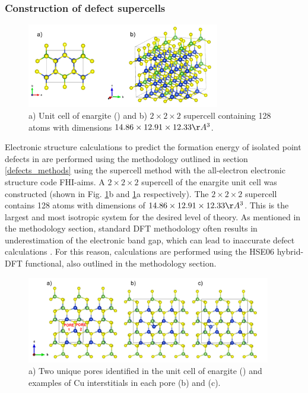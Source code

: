 \documentclass[11pt, twoside]{report}
\begin{document}
\subsubsection{Construction of defect supercells}

\begin{figure}[h!]
    \centering
    \includegraphics[width=0.75\textwidth]{figures/enargite_supercell.png}
    \caption{a) Unit cell of enargite ({\enargite}) and b) $2\times2\times2$ supercell containing 128 atoms with dimensions $14.86\times12.91\times12.33 \AA^3$.}
    \label{enargite_supercell}
\end{figure}

Electronic structure calculations to predict the formation energy of isolated point defects in {\enargite} are performed using the methodology outlined in section \ref{defects_methods} using the supercell method with the all-electron electronic structure code FHI-aims. A $2\times2\times2$ supercell of the enargite unit cell was constructed (shown in Fig. \ref{enargite_supercell}b and \ref{enargite_supercell}a respectively). The $2\times2\times2$ supercell contains 128 atoms with dimensions of $14.86\times12.91\times12.33 \AA^3$. This is the largest and most isotropic system for the desired level of theory. As mentioned in the methodology section, standard DFT methodology often results in underestimation of the electronic band gap, which can lead to inaccurate defect calculations \cite{Lany_defects}. For this reason, calculations are performed using the HSE06 hybrid-DFT functional, also outlined in the methodology section.

\begin{figure}[h!]
    \centering
    \includegraphics[width=0.95\textwidth]{figures/enargite_interstitials.png}
    \caption{a) Two unique pores identified in the unit cell of enargite ({\enargite}) and examples of Cu interstitials in each pore (b) and (c).}
    \label{enargite_interstitials}
\end{figure}
\end{document}
